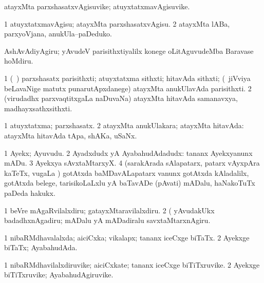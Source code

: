 \bentry
{}
\gl{\nA}
\bmng
atayxMta parxshasatxvAgisuvike; atuyxtatxmavAgisuvike. 
\emng
\eentry

\bentry
{}
\gl{\sakirx}
\bmng
\bnum
\num{1} atuyxtatxmavAgisu; atayxMta parxshasatxvAgisu. 
\num{2} atayxMta lABa, parxyoVjana, anukUla--paDeduko. 
\enum
\emng

\noindent
\gl{\akirx}
\bmng
AshAvAdiyAgiru; yAvudeV parisithxtiyalilx konege oLitAguvudeMba Baravase hoMdiru. 
\emng
\eentry

\bentry
{}
\gl{\nA}
\bmng
\bnum
\num{1} (\kanmu\ \jiVvi) parxshasatx parisithxti; atuyxtatxma sithxti; hitavAda sithxti; (\kanmu\ jiVviya beLavaNige matutx punarutApxdanege) atayxMta anukUlavAda parisithxti. 
\num{2} (virudadhx parxvaqtitxgaLa naDuvaNa) atayxMta hitavAda samanavxya, madhayxsathxsithxti. 
\enum
\emng
\eentry

\bentry
{}
\gl{\gu}
\bmng
\bnum
\num{1} atuyxtatxma; parxshasatx. 
\num{2} atayxMta anukUlakara; atayxMta hitavAda:  atayxMta hitavAda tApa, shAKa, uSaNx. 
\enum
\emng
\eentry

\bentry
{}
\gl{\nA}
\bmng
\bnum
\num{1} Ayekx; Ayuvudu. 
\num{2} Ayadxdudx yA AyabahudAdadudx:  tananx Ayekxyanunx mADu. 
\num{3} Ayekxya sAvxtaMtarxyX. 
\num{4} (sarakArada sAlapatarx, patarx vAyxpAra kaTeTx, \mo vugaLa \vi) gotAtxda baMDavALapatarx \mo vanunx gotAtxda kAladalilx, gotAtxda belege, tarisikoLaLxlu yA baTavADe (pAvati) mADalu, haNakoTuTx paDeda hakukx. 
\enum
\emng

\noindent
\gl{\pagu}
\bmng
\bnum
\num{1}  beVre mAgaRvilalxdiru; gatayxMtaravilalxdiru. 
\num{2}  (  yAvudakUkx badadhxnAgadiru; mADalu yA mADadiralu savxtaMtarxnAgiru. 
\enum
\emng
\eentry

\bentry
{}
\gl{\gu}
\bmng
\bnum
\num{1} nibaRMdhavalalxda; aiciCxka; vikalapx; tananx iceCxge biTaTx. 
\num{2} Ayekxge biTaTx; AyabahudAda. 
\enum
\emng
\eentry

\bentry
{}
\gl{\nA}
\bmng
\bnum
\num{1} nibaRMdhavilalxdiruvike; aiciCxkate; tananx iceCxge biTiTxruvike. 
\num{2} Ayekxge biTiTxruvike; AyabahudAgiruvike. 
\enum
\emng
\eentry

